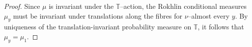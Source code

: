 \documentclass[10pt,a4paper]{amsart}
\begin{document}
\begin{proof}
Since $\mu$ is invariant under the $\mathbb{T}$--action, the Rokhlin
conditional measures $\mu_y$ must be invariant under translations
along the fibres for $\nu$--almost every $y$.
By uniqueness of the translation-invariant probability measure on
$\mathbb{T}$, it follows that $\mu_y=\mu_1$.
\end{proof}
\end{document}
